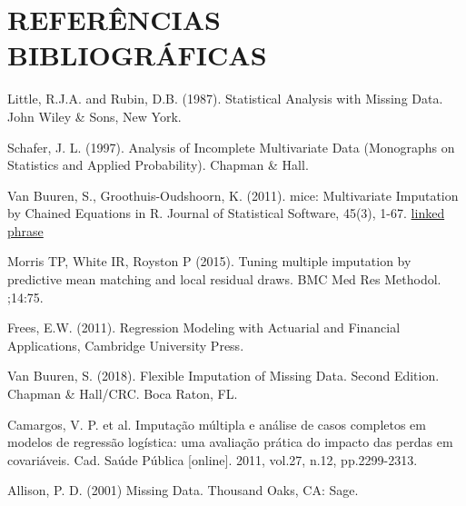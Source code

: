 \documentclass[]{article}
\begin{document}
\section{REFERÊNCIAS BIBLIOGRÁFICAS}\label{referencias-bibliograficas}

Little, R.J.A. and Rubin, D.B. (1987). Statistical Analysis with Missing
Data. John Wiley \& Sons, New York.

Schafer, J. L. (1997). Analysis of Incomplete Multivariate Data
(Monographs on Statistics and Applied Probability). Chapman \& Hall.

Van Buuren, S., Groothuis-Oudshoorn, K. (2011). mice: Multivariate
Imputation by Chained Equations in R. Journal of Statistical Software,
45(3), 1-67. \href{http://www.jstatsoft.org/v45/i03/}{linked phrase}

Morris TP, White IR, Royston P (2015). Tuning multiple imputation by
predictive mean matching and local residual draws. BMC Med Res Methodol.
;14:75.

Frees, E.W. (2011). Regression Modeling with Actuarial and Financial
Applications, Cambridge University Press.

Van Buuren, S. (2018). Flexible Imputation of Missing Data. Second
Edition. Chapman \& Hall/CRC. Boca Raton, FL.

Camargos, V. P. et al. Imputação múltipla e análise de casos completos
em modelos de regressão logística: uma avaliação prática do impacto das
perdas em covariáveis. Cad. Saúde Pública {[}online{]}. 2011, vol.27,
n.12, pp.2299-2313.

Allison, P. D. (2001) Missing Data. Thousand Oaks, CA: Sage.
\end{document}
